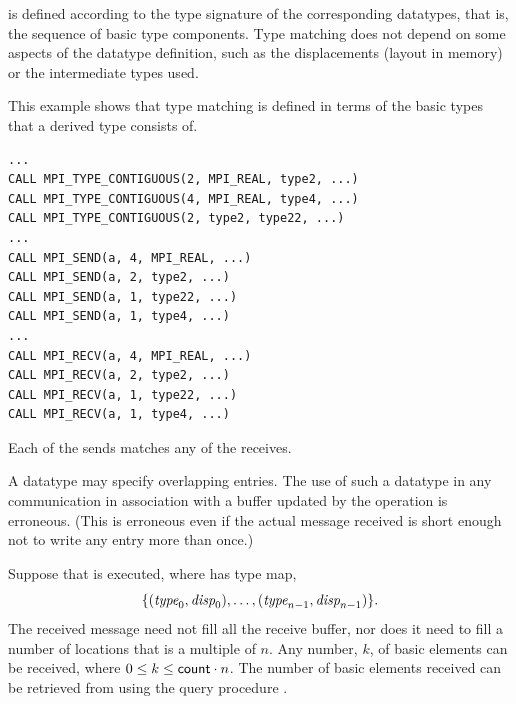 is defined according to the type signature of
the corresponding datatypes, that is, the sequence of basic type
components.  Type matching does not depend on some aspects of the
datatype definition, such as the displacements (layout in memory) or the
intermediate types used.

\begin{example}
\label{pt2pt-exAA}
%
%
This example shows that type matching is defined in terms of
the basic types that a derived type consists of.
\begin{lstlisting}[language={[MPI]Fortran}]
...
CALL MPI_TYPE_CONTIGUOUS(2, MPI_REAL, type2, ...)
CALL MPI_TYPE_CONTIGUOUS(4, MPI_REAL, type4, ...)
CALL MPI_TYPE_CONTIGUOUS(2, type2, type22, ...)
...
CALL MPI_SEND(a, 4, MPI_REAL, ...)
CALL MPI_SEND(a, 2, type2, ...)
CALL MPI_SEND(a, 1, type22, ...)
CALL MPI_SEND(a, 1, type4, ...)
...
CALL MPI_RECV(a, 4, MPI_REAL, ...)
CALL MPI_RECV(a, 2, type2, ...)
CALL MPI_RECV(a, 1, type22, ...)
CALL MPI_RECV(a, 1, type4, ...)
\end{lstlisting}
Each of the sends matches any of the receives.
\end{example}

A datatype may specify overlapping entries. The use of such a
datatype in any communication in association with a buffer updated by
the operation is erroneous. (This is erroneous even
if the actual message received is short enough not to write any entry
more than once.)

Suppose that
 is
executed, where  has type map,
\begin{displaymath}
\{(\textrm{\itshape{type}}_0, \textrm{\itshape{disp}}_0) ,\ldots,(\textrm{\itshape{type}}_{n-1}, \textrm{\itshape{disp}}_{n-1}) \}.
\end{displaymath}
The received message need not fill all the receive buffer, nor does it
need to fill a number of locations that is a multiple of $n$.
Any number, $k$, of basic
elements can be received, where $0 \le k \le \textsf{count} \cdot n$.
The number of basic elements received can be retrieved from
 using the query procedure .

